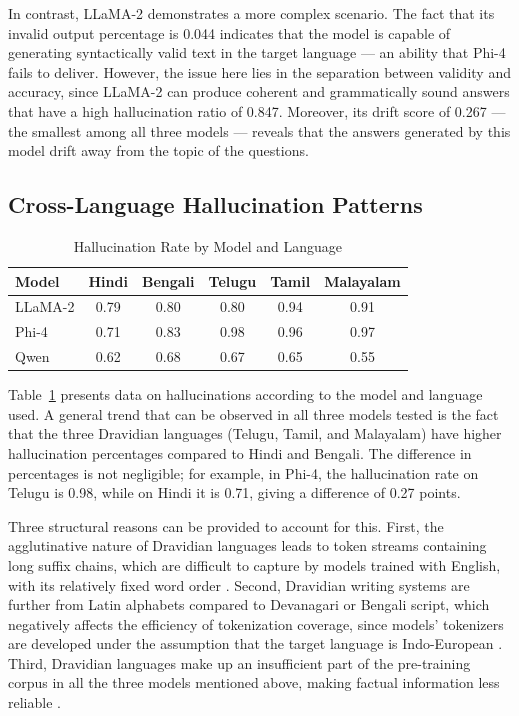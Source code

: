 \documentclass[conference]{IEEEtran}
\begin{document}
In contrast, LLaMA-2 demonstrates a more complex scenario.
The fact that its invalid output percentage is 0.044 indicates that
the model is capable of generating syntactically valid text in
the target language — an ability that Phi-4 fails to deliver. However,
the issue here lies in the separation between validity and accuracy,
since LLaMA-2 can produce coherent and grammatically sound
answers that have a high hallucination ratio of 0.847. Moreover,
its drift score of 0.267 — the smallest among all three models —
reveals that the answers generated by this model drift away from
the topic of the questions.

\subsection{Cross-Language Hallucination Patterns}

\begin{table}[htbp]
\caption{Hallucination Rate by Model and Language}
\centering
\renewcommand{\arraystretch}{1.2}
\begin{tabular}{lccccc}
\toprule
\textbf{Model} & \textbf{Hindi} & \textbf{Bengali} 
& \textbf{Telugu} & \textbf{Tamil} & \textbf{Malayalam} \\
\midrule
LLaMA-2 & 0.79 & 0.80 & 0.80 & 0.94 & 0.91 \\
Phi-4   & 0.71 & 0.83 & 0.98 & 0.96 & 0.97 \\
Qwen    & 0.62 & 0.68 & 0.67 & 0.65 & 0.55 \\
\bottomrule
\end{tabular}
\label{tab:lang}
\end{table}

Table~\ref{tab:lang} presents data on hallucinations according to the 
model and language used. A general trend that can be observed in all 
three models tested is the fact that the three Dravidian languages 
(Telugu, Tamil, and Malayalam) have higher hallucination percentages 
compared to Hindi and Bengali. The difference in percentages is not 
negligible; for example, in Phi-4, the hallucination rate on Telugu 
is 0.98, while on Hindi it is 0.71, giving a difference of 0.27 points.

Three structural reasons can be provided to account for this. First,
the agglutinative nature of Dravidian languages leads to
token streams containing long suffix chains, which are difficult
to capture by models trained with English, with its relatively
fixed word order \cite{b18}. Second, Dravidian writing systems are
further from Latin alphabets compared to Devanagari or Bengali script,
which negatively affects the efficiency of tokenization
coverage, since models' tokenizers are developed under the
assumption that the target language is Indo-European
\cite{b24}. Third, Dravidian languages make up an insufficient part
of the pre-training corpus in all the three models mentioned
above, making factual information less reliable \cite{b24}.
\end{document}
